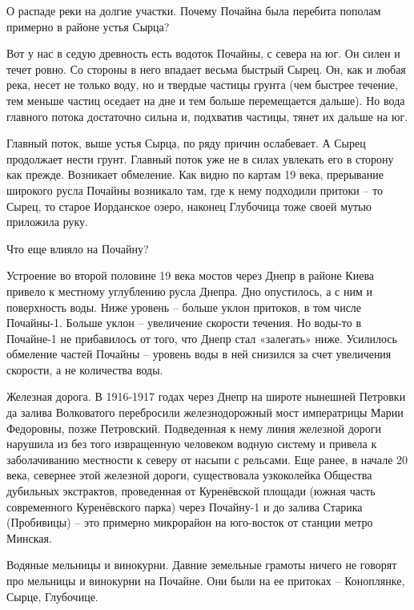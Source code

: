 
О распаде реки на долгие участки. Почему Почайна была перебита пополам примерно в районе устья Сырца?

Вот у нас в седую древность есть водоток Почайны, с севера на юг. Он силен и течет ровно. Со стороны в него впадает весьма быстрый Сырец. Он, как и любая река, несет не только воду, но и твердые частицы грунта (чем быстрее течение, тем меньше частиц оседает на дне и тем больше перемещается дальше). Но вода главного потока достаточно сильна и, подхватив частицы, тянет их дальше на юг.

Главный поток, выше устья Сырца, по ряду причин ослабевает. А Сырец продолжает нести грунт. Главный поток уже не в силах увлекать его в сторону как прежде. Возникает обмеление. Как видно по картам 19 века, прерывание широкого русла Почайны возникало там, где к нему подходили притоки – то Сырец, то старое Иорданское озеро, наконец Глубочица тоже своей мутью приложила руку.

Что еще влияло на Почайну?

Устроение во второй половине 19 века мостов через Днепр в районе Киева привело к местному углублению русла Днепра. Дно опустилось, а с ним и поверхность воды. Ниже уровень – больше уклон притоков, в том числе Почайны-1. Больше уклон – увеличение скорости течения. Но воды-то в Почайне-1 не прибавилось от того, что Днепр стал «залегать» ниже. Усилилось обмеление частей Почайны – уровень воды в ней снизился за счет увеличения скорости, а не количества воды.

Железная дорога. В 1916-1917 годах через Днепр на широте нынешней Петровки да залива Волковатого перебросили железнодорожный мост императрицы Марии Федоровны, позже Петровский. Подведенная к нему линия железной дороги нарушила из без того извращенную человеком водную систему и привела к заболачиванию местности к северу от насыпи с рельсами. Еще ранее, в начале 20 века, севернее этой железной дороги, существовала узкоколейка Общества дубильных экстрактов, проведенная от Куренёвской площади (южная часть современного Куренёвского парка) через Почайну-1 и до залива Старика (Пробивицы) – это примерно микрорайон на юго-восток от станции метро Минская.

Водяные мельницы и винокурни. Давние земельные грамоты ничего не говорят про мельницы и винокурни на Почайне. Они были на ее притоках – Коноплянке, Сырце, Глубочице. 

